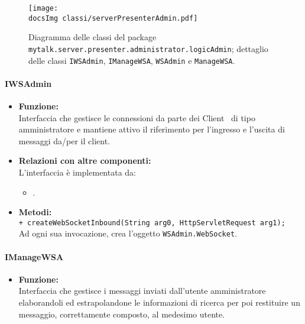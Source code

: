 {{\begin{sloppypar}
{{		\begin{figure}[h!tbp]
		\centering
		\label{fig:presenterServerAdmin}
		\texttt{[image: \\docsImg classi/serverPresenterAdmin.pdf]}
\caption{Diagramma delle classi del package \nolinkurl{mytalk.server.presenter.administrator.logicAdmin}; dettaglio delle classi \nolinkurl{IWSAdmin}, \nolinkurl{IManageWSA}, \nolinkurl{WSAdmin} e  \nolinkurl{ManageWSA}.}		
	\end{figure}	
	

		
		\paragraph{IWSAdmin}\label{par:IWSAdmin}{
			\begin{itemize}
			\item[] \textbf{Funzione:}\\
				Interfaccia che gestisce le connessioni da parte dei Client\g~ di tipo amministratore e mantiene attivo il riferimento per l'ingresso e l'uscita di messaggi da/per il client\g.\\
			
				\item[] \textbf{Relazioni con altre componenti:}\\
					L'interfaccia è implementata da:
					\begin{itemize}
						\item[]	.\\
					\end{itemize}
			
				\item[] \textbf{Metodi:}\\
					\texttt{+ createWebSocketInbound(String arg0, HttpServletRequest arg1);}\\
					Ad ogni sua invocazione, crea l'oggetto \texttt{WSAdmin.WebSocket}.\\
			\end{itemize}
		}
		
		

		\paragraph{IManageWSA}\label{par:IManageWSA}{
			\begin{itemize}
			\item[] \textbf{Funzione:}\\
					Interfaccia che gestisce i messaggi inviati dall'utente amministratore elaborandoli ed estrapolandone le informazioni di ricerca per poi restituire un messaggio, correttamente composto, al medesimo utente.\\
			

\end{itemize}}}}
\end{sloppypar}}}
